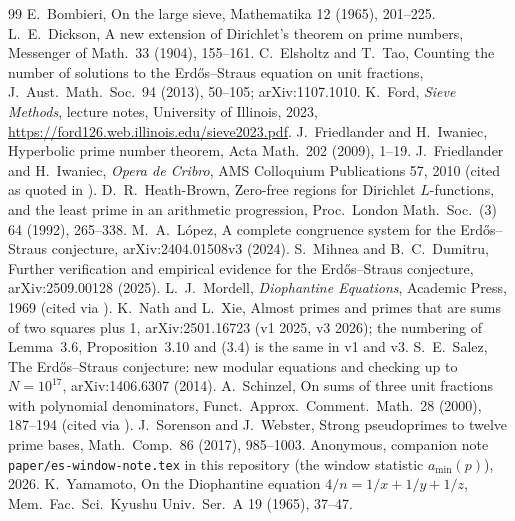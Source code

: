 \documentclass[11pt,reqno]{amsart}
\theoremstyle{definition}
\begin{document}
\begin{thebibliography}{99}
 E.~Bombieri, On the large sieve, Mathematika 12 (1965),
201--225.
 L.~E.~Dickson, A new extension of Dirichlet's theorem on
prime numbers, Messenger of Math.\ 33 (1904), 155--161.
 C.~Elsholtz and T.~Tao, Counting the number of solutions to the
Erd\H{o}s--Straus equation on unit fractions, J.\ Aust.\ Math.\ Soc.\ 94
(2013), 50--105; arXiv:1107.1010.
 K.~Ford, \emph{Sieve Methods}, lecture notes, University of
Illinois, 2023, \url{https://ford126.web.illinois.edu/sieve2023.pdf}.
 J.~Friedlander and H.~Iwaniec, Hyperbolic prime number
theorem, Acta Math.\ 202 (2009), 1--19.
 J.~Friedlander and H.~Iwaniec, \emph{Opera de Cribro}, AMS
Colloquium Publications 57, 2010 (cited as quoted in \cite{NX}).
 D.~R.~Heath-Brown, Zero-free regions for Dirichlet
$L$-functions, and the least prime in an arithmetic progression, Proc.\
London Math.\ Soc.\ (3) 64 (1992), 265--338.
 M.~A.~L\'opez, A complete congruence system for the
Erd\H{o}s--Straus conjecture, arXiv:2404.01508v3 (2024).
 S.~Mihnea and B.~C.~Dumitru, Further verification and empirical
evidence for the Erd\H{o}s--Straus conjecture, arXiv:2509.00128 (2025).
\bibitem{Mordell} L.~J.~Mordell, \emph{Diophantine Equations}, Academic
Press, 1969 (cited via \cite{ET}).
 K.~Nath and L.~Xie, Almost primes and primes that are sums of
two squares plus 1, arXiv:2501.16723 (v1 2025, v3 2026); the numbering of
Lemma~3.6, Proposition~3.10 and (3.4) is the same in v1 and v3.
 S.~E.~Salez, The Erd\H{o}s--Straus conjecture: new modular
equations and checking up to $N=10^{17}$, arXiv:1406.6307 (2014).
\bibitem{Schinzel} A.~Schinzel, On sums of three unit fractions with
polynomial denominators, Funct.\ Approx.\ Comment.\ Math.\ 28 (2000),
187--194 (cited via \cite{ET}).
 J.~Sorenson and J.~Webster, Strong pseudoprimes to twelve
prime bases, Math.\ Comp.\ 86 (2017), 985--1003.
 Anonymous, companion note \texttt{paper/es-window-note.tex}
in this repository (the window statistic $a_{\min}(p)$), 2026.
 K.~Yamamoto, On the Diophantine equation
$4/n=1/x+1/y+1/z$, Mem.\ Fac.\ Sci.\ Kyushu Univ.\ Ser.\ A 19 (1965), 37--47.
\end{thebibliography}
\end{document}
